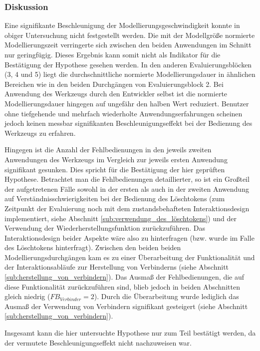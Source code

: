 \subsubsection{Diskussion} 

Eine signifikante Beschleunigung der Modellierungsgeschwindigkeit konnte in obiger Untersuchung nicht festgestellt werden. Die mit der Modellgröße normierte Modellierungszeit verringerte sich zwischen den beiden Anwendungen im Schnitt nur geringfügig. Dieses Ergebnis kann somit nicht als Indikator für die Bestätigung der Hypothese gesehen werden. In den anderen Evaluierungsblöcken (3, 4 und 5) liegt die durchschnittliche normierte Modellierungsdauer in ähnlichen Bereichen wie in den beiden Durchgängen von Evaluierungsblock 2. Bei Anwendung des Werkzeugs durch den Entwickler selbst ist die normierte Modellierungsdauer hingegen auf ungefähr den halben Wert reduziert. Benutzer ohne tiefgehende und mehrfach wiederholte Anwendungserfahrungen scheinen jedoch keinen messbar signifikanten Beschleunigungseffekt bei der Bedienung des Werkzeugs zu erfahren.

Hingegen ist die Anzahl der Fehlbedienungen in den jeweils zweiten Anwendungen des Werkzeugs im Vergleich zur jeweils ersten Anwendung signifikant gesunken. Dies spricht für die Bestätigung der hier geprüften Hypothese. Betrachtet man die Fehlbedienungen detaillierter, so ist ein Großteil der aufgetretenen Fälle sowohl in der ersten als auch in der zweiten Anwendung auf Verständnisschwierigkeiten bei der Bedienung des Löschtokens (zum Zeitpunkt der Evaluierung noch mit dem zustandsbehafteten Interaktionsdesign implementiert, siehe Abschnitt \ref{sub:verwendung_des_löschtokens}) und der Verwendung der Wiederherstellungsfunktion zurückzuführen. Das Interaktionsdesign beider Aspekte wäre also zu hinterfragen (bzw. wurde im Falle des Löschtokens hinterfragt). Zwischen den beiden beiden Modellierungsdurchgängen kam es zu einer Überarbeitung der Funktionalität und der Interaktionsabläufe zur Herstellung von Verbinderns (siehe Abschnitt \ref{sub:herstellung_von_verbindern}). Das Ausmaß der Fehlbedienungen, die auf diese Funktionalität zurückzuführen sind, blieb jedoch in beiden Abschnitten gleich niedrig ($FB_{Verbinder}=2$). Durch die Überarbeitung wurde lediglich das Ausmaß der Verwendung von Verbindern signifikant gesteigert (siehe Abschnitt \ref{sub:herstellung_von_verbindern}).

Insgesamt kann die hier untersuchte Hypothese nur zum Teil bestätigt werden, da der vermutete Beschleunigungseffekt nicht nachzuweisen war.

